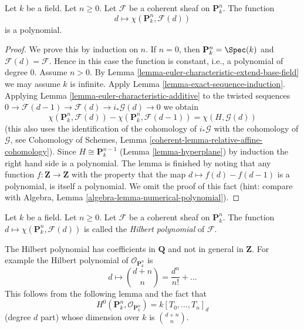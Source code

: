 \begin{lemma}
\label{lemma-hilbert-polynomial}
Let $k$ be a field. Let $n \geq 0$. Let $\mathcal{F}$ be a coherent sheaf
on $\mathbf{P}^n_k$. The function
$$
d \longmapsto \chi(\mathbf{P}^n_k, \mathcal{F}(d))
$$
is a polynomial.
\end{lemma}

\begin{proof}
We prove this by induction on $n$. If $n = 0$, then
$\mathbf{P}^n_k = \Spec(k)$ and $\mathcal{F}(d) = \mathcal{F}$.
Hence in this case the function is constant, i.e., a polynomial
of degree $0$. Assume $n > 0$. By
Lemma \ref{lemma-euler-characteristic-extend-base-field}
we may assume $k$ is infinite. Apply
Lemma \ref{lemma-exact-sequence-induction}.
Applying Lemma \ref{lemma-euler-characteristic-additive}
to the twisted sequences
$0 \to \mathcal{F}(d - 1) \to \mathcal{F}(d) \to i_*\mathcal{G}(d) \to 0$
we obtain
$$
\chi(\mathbf{P}^n_k, \mathcal{F}(d)) -
\chi(\mathbf{P}^n_k, \mathcal{F}(d - 1)) =
\chi(H, \mathcal{G}(d))
$$
(this also uses the identification of the cohomology of
$i_*\mathcal{G}$ with the cohomology of $\mathcal{G}$, see
Cohomology of Schemes, Lemma \ref{coherent-lemma-relative-affine-cohomology}).
Since $H \cong \mathbf{P}^{n - 1}_k$ (Lemma \ref{lemma-hyperplane})
by induction the right hand side is a polynomial.
The lemma is finished by noting that any function
$f : \mathbf{Z} \to \mathbf{Z}$ with the property that the map
$d \mapsto f(d) - f(d - 1)$ is a polynomial, is itself a polynomial.
We omit the proof of this fact (hint: compare with
Algebra, Lemma \ref{algebra-lemma-numerical-polynomial}).
\end{proof}

\begin{definition}
\label{definition-hilbert-polynomial}
Let $k$ be a field. Let $n \geq 0$. Let $\mathcal{F}$ be a coherent sheaf
on $\mathbf{P}^n_k$. The function
$d \mapsto \chi(\mathbf{P}^n_k, \mathcal{F}(d))$ is called the
{\it Hilbert polynomial} of $\mathcal{F}$.
\end{definition}

\noindent
The Hilbert polynomial has coefficients in $\mathbf{Q}$ and not
in general in $\mathbf{Z}$. For example the Hilbert polynomial
of $\mathcal{O}_{\mathbf{P}^n_k}$ is
$$
d \longmapsto {d + n \choose n} = \frac{d^n}{n!} + \ldots
$$
This follows from the following lemma and the fact that
$$
H^0(\mathbf{P}^n_k, \mathcal{O}_{\mathbf{P}^n_k}) = k[T_0, \ldots, T_n]_d
$$
(degree $d$ part) whose dimension over $k$ is ${d + n \choose n}$.

